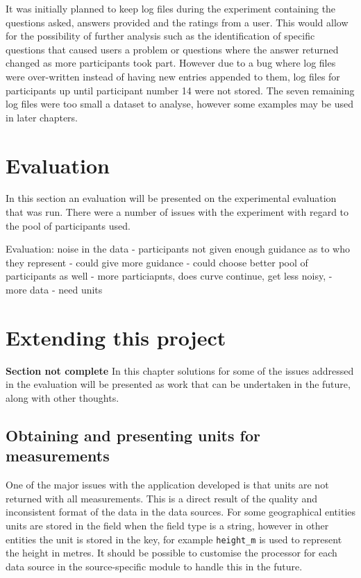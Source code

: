 \documentclass[authoryearcitations]{UoYCSproject}
\begin{document}
It was initially planned to keep log files during the experiment containing the questions asked, answers provided and the ratings from a user. This would allow for the possibility of further analysis such as the identification of specific questions that caused users a problem or questions where the answer returned changed as more participants took part. However due to a bug where log files were over-written instead of having new entries appended to them, log files for participants up until participant number 14 were not stored. The seven remaining log files were too small a dataset to analyse, however some examples may be used in later chapters.

\newpage

\newpage
\chapter{Evaluation}
\label{sec:evaluation}

In this section an evaluation will be presented on the experimental evaluation that was run. There were a number of issues with the experiment with regard to the pool of participants used.


Evaluation:
noise in the data
    - participants not given enough guidance as to who they represent - could give more guidance
    - could choose better pool of participants as well
    - more particiapnts, does curve continue, get less noisy,
    - more data
    - need units

\newpage

\chapter{Extending this project}
\label{sec:extending}
{\bf Section not complete} %
In this chapter solutions for some of the issues addressed in the evaluation will be presented as work that can be undertaken in the future, along with other thoughts.

\section{Obtaining and presenting units for measurements}
\label{sec:evalUnits}
One of the major issues with the application developed is that units are not returned with all measurements. This is a direct result of the quality and inconsistent format of the data in the data sources. For some geographical entities units are stored in the field when the field type is a string, however in other entities the unit is stored in the key, for example \texttt{height_m} is used to represent the height in metres. It should be possible to customise the processor for each data source in the source-specific module to handle this in the future.
\end{document}
